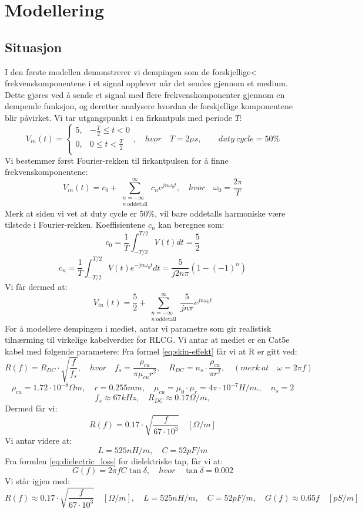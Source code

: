 \section{Modellering}
\subsection{Situasjon}
I den første modellen demonstrerer vi dempingen som de forskjellige< frekvenskomponentene i et signal opplever når det sendes gjennom et medium. Dette gjøres ved å sende et signal med flere frekvenskomponenter gjennom en dempende funksjon, og deretter analysere hvordan de forskjellige komponentene blir påvirket.
Vi tar utgangspunkt i en firkantpuls med periode $T$:
\[
    V_{in}(t) = \begin{cases}
        5, & -\frac{T}{2} \leq t < 0 \\
        0, & 0 \leq t < \frac{T}{2} \\
    \end{cases}, \quad hvor \quad T = 2 \mu s,\qquad duty\ cycle = 50\%
\]
Vi bestemmer først Fourier-rekken til firkantpulsen for å finne frekvenskomponentene:
\[
    V_{in}(t) = c_0 + \sum_{\substack{n=-\infty\\ n\ \text{oddetall}}}^{\infty} c_n e^{j n \omega_0 t}, \quad hvor \quad \omega_0 = \frac{2\pi}{T}
\]
Merk at siden vi vet at duty cycle er 50\%, vil bare oddetalls harmoniske være tilstede i Fourier-rekken.
Koeffisientene $c_n$ kan beregnes som:
\[
    c_0 = \frac{1}{T} \int_{-T/2}^{T/2} V(t) dt = \frac{5}{2}
\]
\[
    c_n = \frac{1}{T} \int_{-T/2}^{T/2} V(t) e^{-j n \omega_0 t} dt =  \frac{5}{j 2 n \pi} (1 - (-1)^n)
\]
Vi får dermed at:
\[
    V_{in}(t) = \frac{5}{2} + \sum_{\substack{n=-\infty\\ n\ \text{oddetall}}}^{\infty} \frac{5}{j n \pi} e^{j n \omega_0 t}
\]
For å modellere dempingen i mediet, antar vi parametre som gir realistisk tilnærming til virkelige kabelverdier for RLCG.
Vi antar at mediet er en Cat5e kabel med følgende parametere:
Fra formel \eqref{eq:skin-effekt} får vi at R er gitt ved:
\[
    R(f) = R_{DC} \cdot \sqrt{\frac{f}{f_{s}}}, \quad hvor \quad f_{s} = \frac{\rho_{cu}}{\pi \mu_{cu} r^2}, \quad R_{DC} = n_s \cdot \frac{\rho_{cu}}{\pi r^2}, \quad (merk\ at \quad \omega = 2\pi f)
\]
\[
    \rho_{cu} = 1.72 \cdot 10^{-8} \Omega m, \quad r = 0.255 mm, \quad \mu_{cu} = \mu_0 \cdot \mu_r = 4\pi \cdot 10^{-7} H/m., \quad n_s = 2
\]
\[
    f_s \approx 67kHz, \quad R_{DC} \approx 0.17 \Omega/m,
\]
Dermed får vi:
\[
    R(f) = 0.17 \cdot \sqrt{\frac{f}{67 \cdot 10^3}} \quad [\Omega/m]
\]
Vi antar videre at:
\[
    L = 525 nH/m, \quad C = 52 pF/m
\]
Fra formlen \eqref{eq:dielectric_loss} for dielektriske tap, får vi at:
\[
    G(f) = 2\pi f C \tan \delta, \quad hvor \quad \tan \delta = 0.002
\]
\clearpage
\noindent Vi står igjen med:
\[
    R(f) \approx 0.17 \cdot \sqrt{\frac{f}{67 \cdot 10^3}} \quad [\Omega/m], \quad L = 525 nH/m, \quad C = 52 pF/m, \quad G(f) \approx 0.65f \quad [pS/m]
\]

